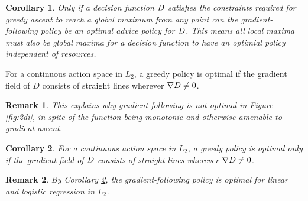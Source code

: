 \newtheorem{corollary}{Corollary}[theorem]
\begin{corollary}
\label{localAreGlobal}
Only if a decision function $D$ satisfies the constraints required for greedy ascent to reach a global maximum from any point can the gradient-following policy be an optimal advice policy for $D$. This means all local maxima must also be global maxima for a decision function to have an optimial policy independent of resources.


\end{corollary}

\newtheorem{theorem2}{Theorem}
\begin{theorem}
\label{Linear}

For a continuous action space in $L_2$, a greedy policy is optimal if the gradient field of $D$ consists of straight lines wherever $\nabla D \ne 0$.

\end{theorem}
\newtheorem*{remark}{Remark}

\begin{remark}
    This explains why gradient-following is not optimal in Figure \ref{fig:2di}, in spite of the function being monotonic and otherwise amenable to gradient ascent.
\end{remark}

\newtheorem{corollary2}{Corollary}[theorem2]
\begin{corollary}
\label{thm:samedirection}
For a continuous action space in $L_2$, a greedy policy is optimal only if the gradient field of $D$ consists of straight lines wherever $\nabla D \ne 0$.
\end{corollary}
\begin{remark}
    By Corollary \ref{thm:samedirection}, the gradient-following policy is optimal for linear and logistic regression in $L_2$.
\end{remark}


